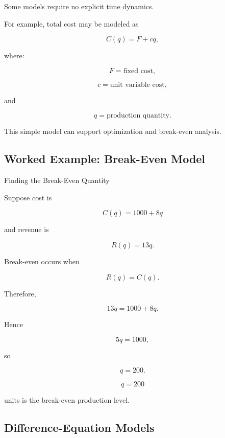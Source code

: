 Some models require no explicit time dynamics.

For example, total cost may be modeled as

\[
\boxed{
C(q)=F+cq,
}
\]

where:

\[
F
=
\text{fixed cost},
\]

\[
c
=
\text{unit variable cost},
\]

and

\[
q
=
\text{production quantity}.
\]

This simple model can support optimization and break-even analysis.

\subsection{Worked Example: Break-Even Model}
\label{subsec:worked-break-even-model}

\begin{workedexamplebox}{Finding the Break-Even Quantity}

Suppose cost is

\[
C(q)=1000+8q
\]

and revenue is

\[
R(q)=13q.
\]

Break-even occurs when

\[
R(q)=C(q).
\]

Therefore,

\[
13q
=
1000+8q.
\]

Hence

\[
5q=1000,
\]

so

\[
q=200.
\]

\begin{answerbox}
\[
\boxed{
q=200
}
\]

units is the break-even production level.
\end{answerbox}

\end{workedexamplebox}

\subsection{Difference-Equation Models}
\label{subsec:difference-equation-models}

